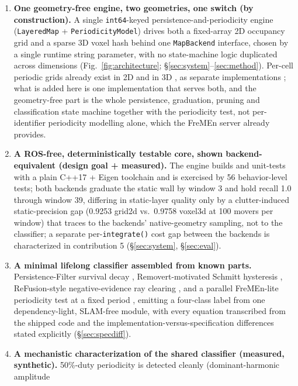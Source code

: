 \documentclass[conference]{IEEEtran}
\begin{document}
\begin{enumerate}
\item \textbf{One geometry-free engine, two geometries, one switch (by construction).}
   A single \texttt{int64}-keyed persistence-and-periodicity engine (\texttt{LayeredMap} +
   \texttt{PeriodicityModel}) drives both a fixed-array 2D occupancy grid and a
   sparse 3D voxel hash behind one \texttt{MapBackend} interface, chosen by a single
   runtime string parameter, with no state-machine logic duplicated across
   dimensions (Fig.~\ref{fig:architecture}; \S\ref{sec:system}--\ref{sec:method}).
   Per-cell periodic grids already exist in 2D and in 3D
   \cite{krajnik2016persistent,krajnik2014froctomap}, as separate
   implementations \cite{fremenrepo}; what is added here is one implementation
   that serves both, and the geometry-free part is the whole persistence,
   graduation, pruning and classification state machine together with the
   periodicity test, not per-identifier periodicity modelling alone, which the
   FreMEn server already provides.
\item \textbf{A ROS-free, deterministically testable core, shown backend-equivalent
   (design goal + measured).} The engine builds and unit-tests with a plain
   C++17 + Eigen toolchain and is exercised by 56 behavior-level tests; both
   backends graduate the static wall by window 3 and hold recall 1.0 through
   window 39, differing in static-layer quality only by a clutter-induced
   static-precision gap (0.9253 grid2d vs.\ 0.9758 voxel3d at 100 movers per
   window) that traces to the backends' native-geometry sampling, not to the
   classifier; a
   separate per-\texttt{integrate()} cost gap between the backends is characterized in
   contribution 5 (\S\ref{sec:system}, \S\ref{sec:eval}).
\item \textbf{A minimal lifelong classifier assembled from known parts.}
   Persistence-Filter survival decay \cite{rosen2016persistence}, Removert-motivated
   Schmitt hysteresis \cite{kim2020removert}, ReFusion-style negative-evidence ray
   clearing \cite{palazzolo2019refusion}, and a parallel FreMEn-lite periodicity
   test at a fixed period \cite{krajnik2017fremen}, emitting a four-class label
   from one dependency-light, SLAM-free module, with every equation transcribed
   from the shipped code and the implementation-versus-specification differences
   stated explicitly (\S\ref{sec:specdiff}).
\item \textbf{A mechanistic characterization of the shared classifier (measured,
   synthetic).}
   50\%-duty periodicity is detected cleanly (dominant-harmonic amplitude

\end{enumerate}
\end{document}
